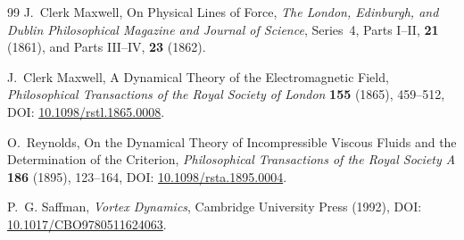 \begin{thebibliography}{99}
J.~Clerk Maxwell,
\newblock On Physical Lines of Force,
\newblock \emph{The London, Edinburgh, and Dublin Philosophical Magazine and Journal of Science}, Series~4, Parts I--II, \textbf{21} (1861), and Parts III--IV, \textbf{23} (1862).

J.~Clerk Maxwell,
\newblock A Dynamical Theory of the Electromagnetic Field,
\newblock \emph{Philosophical Transactions of the Royal Society of London} \textbf{155} (1865), 459--512,
\newblock DOI: \href{https://doi.org/10.1098/rstl.1865.0008}{10.1098/rstl.1865.0008}.

O.~Reynolds,
\newblock On the Dynamical Theory of Incompressible Viscous Fluids and the Determination of the Criterion,
\newblock \emph{Philosophical Transactions of the Royal Society A} \textbf{186} (1895), 123--164,
\newblock DOI: \href{https://doi.org/10.1098/rsta.1895.0004}{10.1098/rsta.1895.0004}.

P.~G. Saffman,
\newblock \emph{Vortex Dynamics},
\newblock Cambridge University Press (1992),
\newblock DOI: \href{https://doi.org/10.1017/CBO9780511624063}{10.1017/CBO9780511624063}.
\end{thebibliography}

